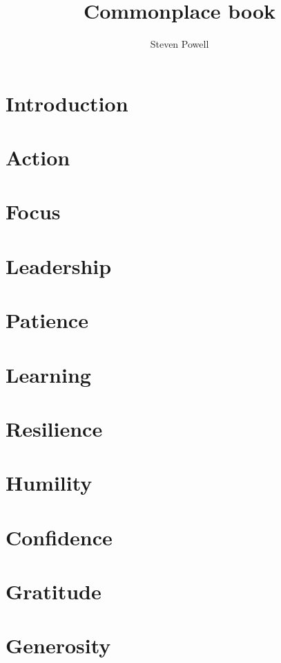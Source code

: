 \documentclass[a5paper]{book}
\title{Commonplace book}
\author{Steven Powell}
\begin{document}
\maketitle{}
\tableofcontents

\chapter{Introduction}


\chapter{Action}


\chapter{Focus}


\chapter{Leadership}


\chapter{Patience}


\chapter{Learning}


\chapter{Resilience}


\chapter{Humility}


\chapter{Confidence}


\chapter{Gratitude}


\chapter{Generosity}


\cleardoublepage
{}

\printindex
\end{document}
